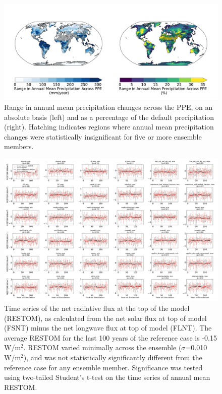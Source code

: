 \documentclass[draft, grl]{agujournal2019}
\begin{document}
\begin{figure}[htb!]
\noindent\includegraphics[width=\textwidth]{writing/figs/PRECT_range_absolute_change.pdf}
\caption{Range in annual mean precipitation changes across the PPE, on an absolute basis (left) and as a percentage of the default precipitation (right). Hatching indicates regions where annual mean precipitation changes were statistically insignificant for five or more ensemble members.
}
\label{fig:supp_precip_range}
\end{figure}

\begin{figure}[htb!]
\noindent\includegraphics[width=\textwidth]
{writing/figs/Figure_S_Minimal_RESTOM_differences.pdf}
\caption{Time series of the net radiative flux at the top of the model (RESTOM), as calculated from the net solar flux at top of model (FSNT) minus the net longwave flux at top of model (FLNT). The average RESTOM for the last 100 years of the reference case is -0.15 W$/$m$^2$. RESTOM varied minimally across the ensemble ($\sigma$=0.010 W/m$^2$), and was not statistically significantly different from the reference case for any ensemble member. Significance was tested using two-tailed Student’s t-test on the  time series of annual mean RESTOM.}
\label{fig:supp_TOA_energy_balance}
\end{figure}
\end{document}
